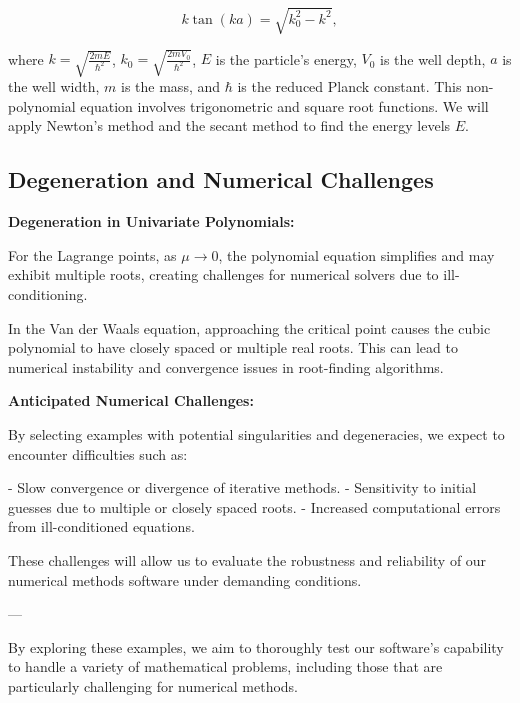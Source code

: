 \documentclass[12pt]{article}
\begin{document}
\[
k \tan(k a) = \sqrt{k_0^2 - k^2},
\]

where \( k = \sqrt{\frac{2 m E}{\hbar^2}} \), \( k_0 = \sqrt{\frac{2 m V_0}{\hbar^2}} \), \( E \) is the particle's energy, \( V_0 \) is the well depth, \( a \) is the well width, \( m \) is the mass, and \( \hbar \) is the reduced Planck constant. This non-polynomial equation involves trigonometric and square root functions. We will apply Newton’s method and the secant method to find the energy levels \( E \).

\subsection*{Degeneration and Numerical Challenges}

\textbf{Degeneration in Univariate Polynomials:}

For the Lagrange points, as \( \mu \rightarrow 0 \), the polynomial equation simplifies and may exhibit multiple roots, creating challenges for numerical solvers due to ill-conditioning.

In the Van der Waals equation, approaching the critical point causes the cubic polynomial to have closely spaced or multiple real roots. This can lead to numerical instability and convergence issues in root-finding algorithms.

\textbf{Anticipated Numerical Challenges:}

By selecting examples with potential singularities and degeneracies, we expect to encounter difficulties such as:

- Slow convergence or divergence of iterative methods.
- Sensitivity to initial guesses due to multiple or closely spaced roots.
- Increased computational errors from ill-conditioned equations.

These challenges will allow us to evaluate the robustness and reliability of our numerical methods software under demanding conditions.

---

By exploring these examples, we aim to thoroughly test our software's capability to handle a variety of mathematical problems, including those that are particularly challenging for numerical methods.
\end{document}

